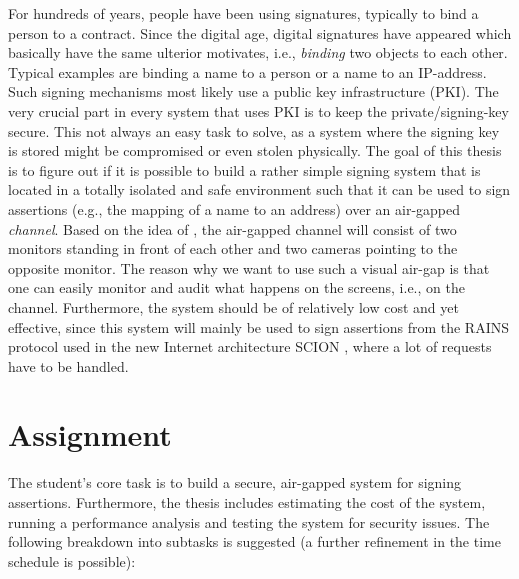 \documentclass[a4paper, 11pt]{article}
\begin{document}
For hundreds of years, people have been using signatures, typically to bind a person to a contract. Since the digital age, digital signatures have appeared which basically have the same ulterior motivates, i.e., \emph{binding} two objects to each other. Typical examples are binding a name to a person or a name to an IP-address. Such signing mechanisms most likely use a public key infrastructure (PKI). The very crucial part in every system that uses PKI is to keep the private/signing-key secure. This not always an easy task to solve, as a system where the signing key is stored might be compromised or even stolen physically. The goal of this thesis is to figure out if it is possible to build a rather simple signing system that is located in a totally isolated and safe environment such that it can be used to sign assertions (e.g., the mapping of a name to an address) over an air-gapped \emph{channel}. Based on the idea of \cite{Matsumoto}, the air-gapped channel will consist of two monitors standing in front of each other and two cameras pointing to the opposite monitor. The reason why we want to use such a visual air-gap is that one can easily monitor and audit what happens on the screens, i.e., on the channel. Furthermore, the system should be of relatively low cost and yet effective, since this system will mainly be used to sign assertions from the RAINS protocol used in the new Internet architecture SCION \cite{Barrera}, where a lot of requests have to be handled.

\section{Assignment}

The student's core task is to build a secure, air-gapped system for signing assertions. Furthermore, the thesis includes estimating the cost of the system, running a performance analysis  and testing the system for security issues. The following breakdown into subtasks is suggested (a further refinement in the time schedule is possible):
\end{document}
